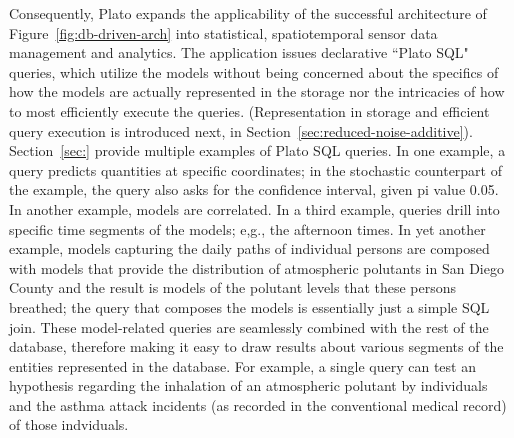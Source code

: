 Consequently, Plato expands the applicability of the successful architecture of Figure~\ref{fig:db-driven-arch} into statistical, spatiotemporal sensor data management and analytics. The application issues declarative ``Plato SQL" queries, which utilize the models without being concerned about the specifics of how the models are actually represented in the storage nor the intricacies of how to most efficiently execute the queries. (Representation in storage and efficient query execution is introduced next, in Section~\ref{sec:reduced-noise-additive}).  Section~\ref{sec:} provide multiple examples of Plato SQL queries. In one example, a query predicts quantities at specific coordinates; in the stochastic counterpart of the example, the query also asks for the confidence interval, given pi value 0.05. In another example, models are correlated. In a third example, queries drill into specific time segments of the models; e,g., the afternoon times. In yet another example, models capturing the daily paths of individual persons are composed with models that provide the distribution of atmospheric polutants in San Diego County and the result is models of the polutant levels that these persons breathed; the query that composes the models is essentially just a simple SQL join. These model-related queries are seamlessly combined with the rest of the database, therefore making it easy to draw results about various segments of the entities represented in the database. For example, a single query can test an hypothesis regarding the inhalation of an atmospheric polutant by individuals and the asthma attack incidents (as recorded in the conventional medical record) of those indviduals.

